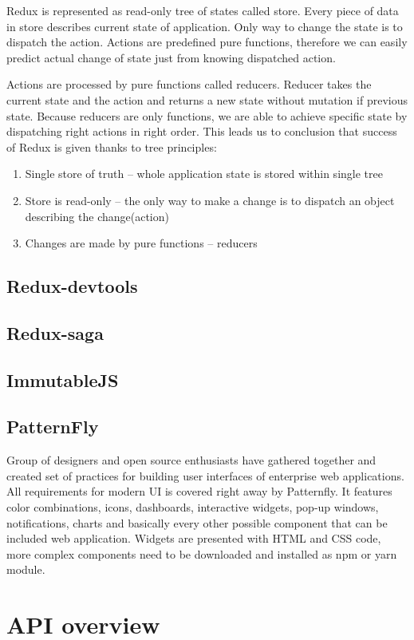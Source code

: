Redux is represented as read-only tree of states called store. Every piece of data in store describes current state of application. Only way to change the state is to dispatch the action. Actions are predefined pure functions, therefore we can easily predict actual change of state just from knowing dispatched action.

Actions are processed by pure functions called reducers. Reducer takes the current state and the action and returns a new state without mutation if previous state. Because reducers are only functions, we are able to achieve specific state by dispatching right actions in right order. This leads us to conclusion that success of Redux is given thanks to tree principles:
\begin{enumerate}
\item Single store of truth -- whole application state is stored within single tree
\item Store is read-only -- the only way to make a change is to dispatch an object describing the change(action)
\item Changes are made by pure functions -- reducers 
\end{enumerate}


\section{Redux-devtools}
\section{Redux-saga}
\section{ImmutableJS}
\section{PatternFly}
Group of designers and open source enthusiasts have gathered together and created set of practices for building user interfaces of enterprise web applications. All requirements for modern UI is covered right away by Patternfly. It features color combinations, icons, dashboards, interactive widgets, pop-up windows, notifications, charts and basically every other possible component that can be included web application. Widgets are presented with HTML and CSS code, more complex components need to be downloaded and installed as npm or yarn module.

\chapter{API overview}

